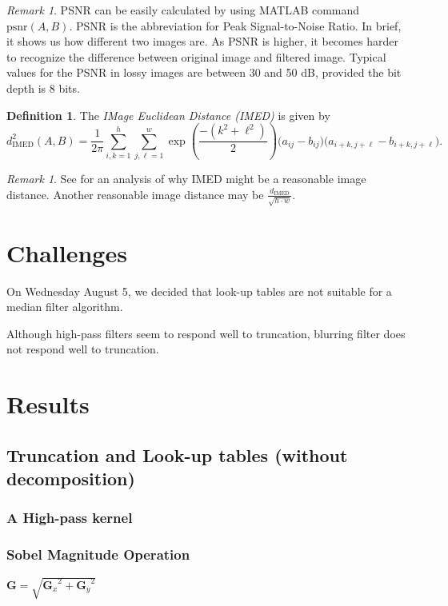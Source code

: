 \documentclass[12pt]{amsart}
\theoremstyle{definition}
\newtheorem{defn}[thm]{Definition}
\theoremstyle{remark}
\newtheorem{rem}[thm]{Remark}
\numberwithin{thm}{section}
\begin{document}
\begin{rem}
PSNR can be easily calculated by using MATLAB command $\textrm{psnr}(A,B)$.
PSNR is the abbreviation for Peak Signal-to-Noise Ratio. In brief, it shows us how different two images are. As PSNR is higher, it becomes harder to recognize the difference between original image and filtered image. Typical values for the PSNR in lossy images are between 30 and 50 dB, provided the bit depth is 8 bits. 
\end{rem}

\begin{defn}
The \emph{IMage Euclidean Distance (IMED)} is given by
\[d_\text{IMED}^2(A,B) = \frac{1}{2\pi}\sum_{i,k = 1}^h\sum_{j,\ell = 1}^w \exp\left(\frac{-(k^2+\ell^2)}{2}\right)\big(a_{ij}-b_{ij}\big)\big(a_{i+k,j+\ell} - b_{i+k,j+\ell}\big).\]
\end{defn}
\begin{rem}
See \cite{FWZ05} for an analysis of why IMED might be a reasonable image distance. Another reasonable image distance may be $\frac{d_\text{IMED}}{\sqrt{h\cdot w}}$.
\end{rem}

\section{Challenges}
On Wednesday August 5, we
decided that look-up tables  are not suitable for a median filter algorithm.

Although high-pass filters seem to respond well to truncation, blurring filter does not respond well to truncation.

\section{Results}

\subsection{Truncation and Look-up tables (without decomposition)}

\subsubsection{A High-pass kernel}

\subsubsection{Sobel Magnitude Operation}
$\mathbf{G} = \sqrt{ {\mathbf{G}_x}^2 + {\mathbf{G}_y}^2 }$
\end{document}
